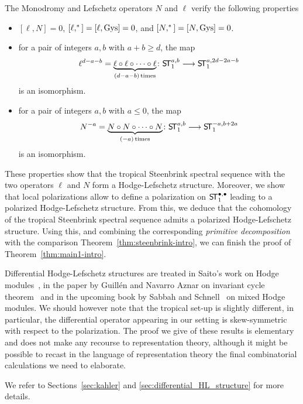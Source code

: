 \documentclass[11pt]{amsart}
\theoremstyle{definition}
\numberwithin{equation}{section}
\renewcommand{\~}{\widetilde}
\DeclareMathOperator{\gys}{Gys} %
\let\i\relax
\newcommand{\i}{{\mathop{}\mathrm{i}}} %
\newcommand{\ST}{\textnormal{\textsf{S\!T}}} %
\begin{document}
\smallskip
The Monodromy and Lefschetz operators $N$ and $\ell$ verify the following properties
\begin{itemize}
\item $[\ell, N] = 0$, $[\ell, \i^*] = [\ell, \gys] =0$, and $[N,\i^*] = [N, \gys] =0$.

\smallskip
\item for a pair of integers $a,b$ with $a+b \geq d$, the map
\[\ell^{d-a-b} = \underbrace{\ell \circ \ell \circ \dots \circ \ell}_{(d-a-b) \,\textrm{times}} \colon \ST_1^{a,b} \longrightarrow \ST_1^{a, 2d - 2a-b}\]
is an isomorphism.

\smallskip
\item for a pair of integers $a,b$ with $a\leq 0$, the map
\[N^{-a} = \underbrace{N \circ N \circ \dots \circ N}_{(-a) \,\textrm{times}} \colon  \ST_1^{a,b} \longrightarrow \ST_1^{-a, b + 2a}\] is an isomorphism.
\end{itemize}

These properties show that the tropical Steenbrink spectral sequence with the two operators $\ell$ and $N$ form a Hodge-Lefschetz structure. Moreover, we show that local polarizations allow to define a polarization on $\ST_1^{\bullet, \bullet}$ leading to a polarized Hodge-Lefschetz structure.
From this, we deduce that the cohomology of the tropical Steenbrink spectral sequence admits a polarized Hodge-Lefschetz structure. Using this, and combining the corresponding \emph{primitive decomposition} with the comparison Theorem~\ref{thm:steenbrink-intro}, we can finish the proof of Theorem~\ref{thm:main1-intro}.

\medskip

Differential Hodge-Lefschetz structures are treated in Saito's work on Hodge modules~\cite{Saito}, in the paper by Guill\'en and Navarro Aznar on invariant cycle theorem~\cite{GNA90} and in the upcoming book by Sabbah and Schnell~\cite{SabSch} on mixed Hodge modules. We should however note that the tropical set-up is slightly different, in particular, the differential operator appearing in our setting is skew-symmetric with respect to the polarization. The proof we give of these results is elementary and does not make any recourse to representation theory, although it might be possible to recast in the language of representation theory the final combinatorial calculations we need to elaborate.

\medskip

We refer to Sections~\ref{sec:kahler} and \ref{sec:differential_HL_structure} for more details.
\end{document}
